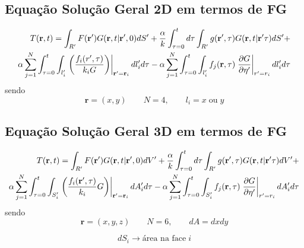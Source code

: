 \subsection{Equação Solução Geral 2D em termos de FG}

\begin{equation}\label{eq:GERAL3DG1}
    \begin{split}
        T(\textbf{r},t)= \int_{R'} F(\textbf{r}')G(\textbf{r},t|\textbf{r}',0) dS' +
        \frac{\alpha}{k} 
        \int_{\tau=0}^{t} d\tau\int_{R'} g(\textbf{r}',\tau) G(\textbf{r},t|\textbf{r}'\tau) dS' + \\ 
	\alpha \sum_{j=1}^{N}\int_{\tau=0}^{t}\int_{l'_i}
        \left. \left( \frac{f_i(r',\tau)}{k_i G}\right) 
        \right|_{\textbf{\textbf{r}}'=\textbf{r}_i} dl'_i  d\tau -
	\alpha \sum_{j=1}^{N}\int_{\tau=0}^{t} 
        \int_{l'_i}	f_j(\textbf{r},\tau) 
        \left. \frac{\partial{G}}{\partial{\eta'}} \right|_{r'=r_i} dl'_i  d\tau        
    \end{split}
\end{equation}
sendo
\begin{equation*}\label{eq:Geral2}
    \textbf{r}= (x,y) \qquad N=4, \qquad l_i = x \; \text{ou} \; y 
\end{equation*}
	
\subsection{Equação Solução Geral 3D em termos de FG}
\begin{equation}\label{eq:GERAL3DG}
    \begin{split}
       T(\textbf{r},t) = 
        \int_{R'} F(\textbf{r}')G(\textbf{r},t|\textbf{r}',0) dV' +
       \frac{\alpha}{k} 
       \int_{\tau=0}^{t} d\tau\int_{R'} g(\textbf{r}',\tau) G(\textbf{r},t|\textbf{r}'\tau) dV' + \\
        \alpha \sum_{j=1}^{N} \int_{\tau=0}^{t} \int_{S'_i}
       \left. \left({\frac{f_i(\textbf{r}',\tau)}{k_i} G}\right) \right|_{\textbf{\textbf{r}}'=\textbf{r}_i} dA'_i d\tau -
       \alpha \sum_{j=1}^{N} \int_{\tau=0}^{t} \int_{S'_i}
       f_j(\textbf{r},\tau) 
       \left.{\frac{\partial G}{\partial \eta'}}\right|_{r'=r_i} dA'_i d\tau     
   \end{split}
\end{equation}
sendo
\begin{equation*}\label{eq:Geral3}
    \textbf{r}= (x,y,z) \qquad N=6, \qquad dA = dxdy
\end{equation*}

\begin{equation*}\label{eq:Geral4}
    dS_i \rightarrow  \text{área na face} \; i           
\end{equation*}

\printbibliography[heading=subbibliography]